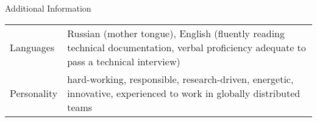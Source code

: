 \documentclass{resume} %
\begin{document}
\begin{rSection}{Additional Information}

\begin{table}[h]
\begin{tabularx}{\textwidth}{l X}
Languages & Russian (mother tongue), English (fluently reading technical documentation, verbal proficiency adequate to pass a technical interview) \\
Personality & hard-working, responsible, research-driven, energetic, innovative, experienced to work in globally distributed teams
\end{tabularx}
\end{table}

\end{rSection}

\end{document}
